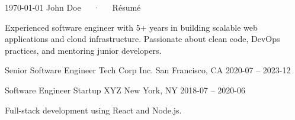 \documentclass[11pt, a4paper]{awesome-cv}
\begin{document}
\makecvheader[C]

\makecvfooter
  {\today}
  {John Doe~~~·~~~Résumé}
  {\thepage}


\begin{cvparagraph}

Experienced software engineer with 5+ years in building scalable web applications and cloud infrastructure. Passionate about clean code, DevOps practices, and mentoring junior developers.

\end{cvparagraph}


\cvexperience
  {Senior Software Engineer}
  {Tech Corp Inc.}
  {San Francisco, CA}
  {2020-07 -- 2023-12}

\cvexperience
  {Software Engineer}
  {Startup XYZ}
  {New York, NY}
  {2018-07 -- 2020-06}

\begin{cvitems}
  \item {Full-stack development using React and Node.js.}
\end{cvitems}

\end{document}
